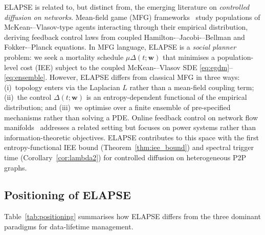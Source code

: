 \documentclass[review,12pt]{elsarticle}
\newcommand{\bfw}{\mathbf{w}}
\begin{document}
ELAPSE is related to, but distinct from, the emerging literature on
\emph{controlled diffusion on networks}.
Mean-field game (MFG) frameworks~\cite{carmona2018probabilistic,achdou2020mean}
study populations of McKean-–Vlasov-type agents interacting through their
empirical distribution, deriving feedback control laws from coupled
Hamilton-–Jacobi-–Bellman and Fokker-–Planck equations.
In MFG language, ELAPSE is a \emph{social planner} problem: we seek a
mortality schedule $\mu\Delta(t;\bfw)$ that minimises a population-level cost
(IEE) subject to the coupled McKean-–Vlasov SDE \eqref{eq:egdm}--\eqref{eq:ensemble}.
However, ELAPSE differs from classical MFG in three ways: (i)~topology enters
via the Laplacian $L$ rather than a mean-field coupling term; (ii)~the control
$\Delta(t;\bfw)$ is an entropy-dependent functional of the empirical
distribution; and (iii)~we optimise over a finite ensemble of pre-specified
mechanisms rather than solving a PDE.
Online feedback control on network flow
manifolds~\cite{bianchin2021online} addresses a related setting but focuses on
power systems rather than information-theoretic objectives.
ELAPSE contributes to this space with the first entropy-functional IEE bound
(Theorem~\ref{thm:iee_bound}) and spectral trigger time
(Corollary~\ref{cor:lambda2}) for controlled diffusion on heterogeneous P2P graphs.

\subsection{Positioning of ELAPSE}

Table~\ref{tab:positioning} summarises how ELAPSE differs from the three
dominant paradigms for data-lifetime management.
\end{document}

